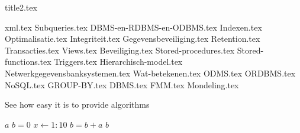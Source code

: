 \documentclass[a4paper,11pt]{article}
\begin{document}


{title2.tex}

\clearpage

\thispagestyle{empty}

\tableofcontents

\clearpage



{xml.tex}
{Subqueries.tex}
{DBMS-en-RDBMS-en-ODBMS.tex}
{Indexen.tex}
{Optimalisatie.tex}
{Integriteit.tex}
{Gegevensbeveiliging.tex}
{Retention.tex}
{Transacties.tex}
{Views.tex}
{Beveiliging.tex}
{Stored-procedures.tex}
{Stored-functions.tex}
{Triggers.tex}
{Hierarchisch-model.tex}
{Netwerkgegevensbanksystemen.tex}
{Wat-betekenen.tex}
{ODMS.tex}
{ORDBMS.tex}
{NoSQL.tex}
{GROUP-BY.tex}
{DBMS.tex}
{FMM.tex}
{Mondeling.tex}


\begin{algorithm}[ht]
\caption{See how easy it is to provide algorithms}
\label{myFirstAlgorithm}
\begin{algorithmic}
\REQUIRE $a$
\STATE $b = 0$
\STATE $x \leftarrow 1:10$
    \STATE $b = b+a$
\ENDFOR
\RETURN $b$
\end{algorithmic}
\end{algorithm}



\listofalgorithms
\clearpage
\listoffigures
\clearpage
\listoftables
\clearpage

\printglossary[title=Termen,toctitle=Lijst van termen]

\printglossary[type=\acronymtype]


\clearpage
\end{document}
